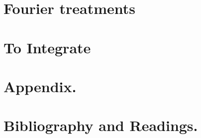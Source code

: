 \documentclass[12pt,leqno]{book}
\begin{document}
\part{Fourier treatments}









\part{To Integrate}


\part{Appendix.}




\part{Bibliography and Readings.}




%





%
\end{document}

